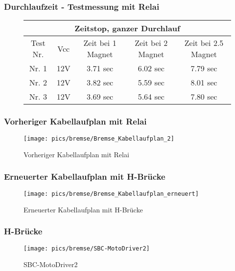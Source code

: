 \documentclass[12pt,a4paper]{article}
\begin{document}
\subsubsection*{Durchlaufzeit - Testmessung mit Relai}
\begin{figure}[h!]
\centering
\begin{tabular}{|c|c|c|c|c|}
\hline
\multicolumn{5}{|c|}{Zeitstop, ganzer Durchlauf}\\
\hline
\hline
Test Nr. & Vcc & Zeit bei 1 Magnet & Zeit bei 2 Magnet & Zeit bei 2.5 Magnet\\
\hline
Nr. 1 & 12V & 3.71 sec & 6.02 sec & 7.79 sec\\ 
Nr. 2 & 12V & 3.82 sec & 5.59 sec & 8.01 sec\\
Nr. 3 & 12V & 3.69 sec & 5.64 sec & 7.80 sec\\
\hline
\end{tabular}
\end{figure}
%
%
\newpage
\subsubsection*{Vorheriger Kabellaufplan mit Relai}
\begin{figure}[h!]
	\centering	
	\texttt{[image: pics/bremse/Bremse\_Kabellaufplan\_2]}
	\caption{Vorheriger Kabellaufplan mit Relai}
\end{figure}
%
%
\newpage
\subsubsection*{Erneuerter Kabellaufplan mit H-Brücke}
\begin{figure}[h!]
	\centering	
	\texttt{[image: pics/bremse/Bremse\_Kabellaufplan\_erneuert]}
	\caption{Erneuerter Kabellaufplan mit H-Brücke}
\end{figure}
%
%
\newpage
\subsubsection*{H-Brücke}
\begin{figure}[h!]
	\centering
	\texttt{[image: pics/bremse/SBC-MotoDriver2]}
	\caption{SBC-MotoDriver2}
\end{figure}
%
%
\newpage
\end{document}
